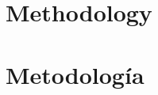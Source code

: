 %

{
  \chapter{Methodology}
}
{
  \chapter{Metodología}
}
\label{cha:compendium-methodology}









